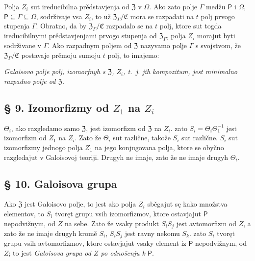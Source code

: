 \documentclass[11pt]{article}
\begin{document}
Polja \(Z_i\) sut ireducibilna prědstavjenja od \(\mathfrak Z\) v \(\Omega\). Ako zato polje \(\Gamma\) medžu \(\mathsf P\) i \(\Omega\), \(\mathsf P\subseteq\Gamma\subseteq\Omega\), sodrživaje vsa \(Z_i\), to už \(\mathfrak Z_\Gamma/\mathfrak C\) mora se razpadati na \(t\) polj prvogo stupenja \(\Gamma\). Obratno, da by \(\mathfrak Z_\Gamma/\mathfrak C\) razpadalo se na \(t\) polj, ktore sut togda ireducibilnymi prědstavjenjami prvogo stupenja od \(\mathfrak Z_\Gamma\), polja \(Z_i\) morajut byti sodrživane v \(\Gamma\). Ako razpadnym poljem od \(\mathfrak Z\) nazyvamo polje \(\Gamma\) s svojstvom, že \(\mathfrak Z_\Gamma/\mathfrak C\) postavaje prěmoju sumoju \(t\) polj, to imajemo:

\emph{Galoisovo polje polj, izomorfnyh s \(\mathfrak Z\), \(Z_i\), t.~j. jih kompozitum, jest minimalno razpadno polje od \(\mathfrak Z\).}

\subsection*{§ 9. Izomorfizmy od \(Z_1\) na \(Z_i\)}\label{die-isomorphismen-von-z1-auf-die-zi}

\(\Theta_i\), ako razgledamo samo \(\mathfrak Z\), jest izomorfizm od \(\mathfrak Z\) na \(Z_i\). zato \(S_i=\Theta_i\Theta_1^{-1}\) jest izomorfizm od \(Z_1\) na \(Z_i\). Zato že \(\Theta_i\) sut različne, takože \(S_i\) sut različne. \(S_i\) sut izomorfizmy jednogo polja \(Z_1\) na jego konjugovana polja, ktore se obyčno razgledajut v Galoisovoj teoriji. Drugyh ne imaje, zato že ne imaje drugyh \(\Theta_i\).

\subsection*{§ 10. Galoisova grupa}\label{die-galoissche-gruppe}

Ako \(\mathfrak Z\) jest Galoisovo polje, to jest ako polja \(Z_i\) sběgajut sę kako množstva elementov, to \(S_i\) tvoręt grupu vsih izomorfizmov, ktore ostavjajut \(\mathsf P\) nepodvižnym, od \(Z\) na sebe. Zato že vsaky produkt \(S_iS_j\) jest avtomorfizm od \(Z\), a zato že ne imaje drugyh kromě \(S_i\), \(S_iS_j\) jest ravny nekomu \(S_k\). zato \(S_i\) tvoręt grupu vsih avtomorfizmov, ktore ostavjajut vsaky element iz \(\mathsf P\) nepodvižnym, od \(Z\); to jest \emph{Galoisova grupa od \(Z\) po odnošenju k \(\mathsf P\)}.

\end{document}

